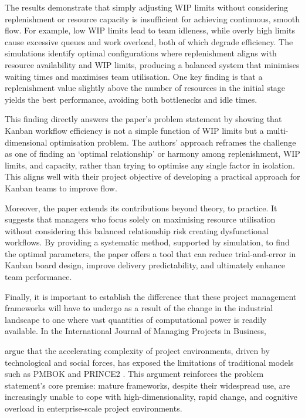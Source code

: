 \documentclass{report}
\begin{document}
The results demonstrate that simply adjusting WIP limits without considering replenishment or resource capacity is insufficient for achieving continuous, smooth flow. 
For example, low WIP limits lead to team idleness, while overly high limits cause excessive queues and work overload, both of which degrade efficiency. 
The simulations identify optimal configurations where replenishment aligns with resource availability and WIP limits, producing a balanced system that minimises waiting times and maximises team utilisation. 
One key finding is that a replenishment value slightly above the number of resources in the initial stage yields the best performance, avoiding both bottlenecks and idle times.

This finding directly answers the paper's problem statement by showing that Kanban workflow efficiency is not a simple function of WIP limits but a multi-dimensional optimisation problem. 
The authors' approach reframes the challenge as one of finding an `optimal relationship' or harmony among replenishment, WIP limits, and capacity, rather than trying to optimise any single factor in isolation. 
This aligns well with their project objective of developing a practical approach for Kanban teams to improve flow.

Moreover, the paper extends its contributions beyond theory, to practice. 
It suggests that managers who focus solely on maximising resource utilisation without considering this balanced relationship risk creating dysfunctional workflows. 
By providing a systematic method, supported by simulation, to find the optimal parameters, the paper offers a tool that can reduce trial-and-error in Kanban board design, improve delivery predictability, and ultimately enhance team performance.

Finally, it is important to establish the difference that these project management frameworks will have to undergo as a result of the change in the industrial landscape to one where vast quantities of computational power is readily available. 
In the International Journal of Managing Projects in Business, \author{sonta-draczkowskaChallengesScalingAgile2024} argue that the accelerating complexity of project environments, driven by technological and social forces, has exposed the limitations of traditional models such as PMBOK and PRINCE2 \parencite{sonta-draczkowskaChallengesScalingAgile2024}. 
This argument reinforces the problem statement's core premise: mature frameworks, despite their widespread use, are increasingly unable to cope with high-dimensionality, rapid change, and cognitive overload in enterprise-scale project environments.
\end{document}
